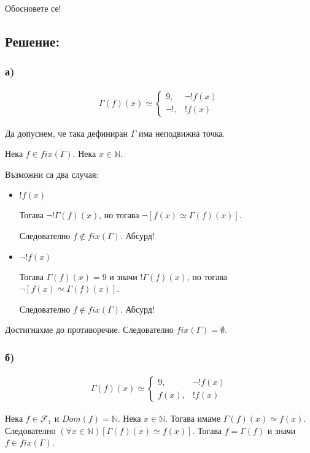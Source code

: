 \documentclass{article}
\begin{document}
Обосновете се!

\subsection*{Решение:}

\subsubsection*{а)}
\begin{align*}
\Gamma(f)(x) \simeq \begin{cases}
9, & \lnot !f(x) \\
\lnot!, & !f(x)
\end{cases}
\end{align*}

Да допуснем, че така дефиниран \(\Gamma\) има неподвижна точка.

Нека \(f \in fix(\Gamma)\). Нека \(x \in \mathbb{N}\).

Възможни са два случая:
\begin{itemize}
\item \(!f(x)\)

Тогава \(\lnot!\Gamma(f)(x)\), но тогава \(\lnot[f(x) \simeq \Gamma(f)(x)]\).

Следователно \(f \notin fix(\Gamma)\). Абсурд!

\item \(\lnot!f(x)\)

Тогава \(\Gamma(f)(x) = 9\) и значи \(!\Gamma(f)(x)\), но тогава \(\lnot[f(x) \simeq \Gamma(f)(x)]\).

Следователно \(f \notin fix(\Gamma)\). Абсурд!
\end{itemize}

Достигнахме до противоречие. Следователно \(fix(\Gamma) = \emptyset\).

\subsubsection*{б)}
\begin{align*}
\Gamma(f)(x) \simeq \begin{cases}
9, & \lnot !f(x) \\
f(x), & !f(x)
\end{cases}
\end{align*}

Нека \(f \in \mathcal{F}_1\) и \(Dom(f) = \mathbb{N}\).
Нека \(x \in \mathbb{N}\).
Тогава имаме \(\Gamma(f)(x) \simeq f(x)\).
Следователно \((\forall x \in \mathbb{N})[\Gamma(f)(x) \simeq f(x)]\).
Тогава \(f = \Gamma(f)\) и значи \(f \in fix(\Gamma)\).
\end{document}
